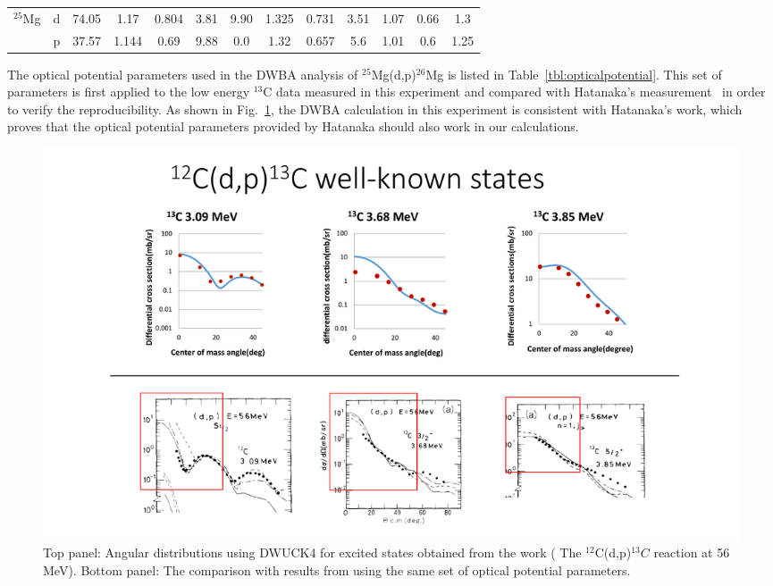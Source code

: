 {\begin{center}
\begin{longtable}{lcccccccccccc}
\endhead %

\endfoot %
  \bottomrule
\endlastfoot %
   $^{25}$Mg    &d & 74.05   &  1.17  &   0.804 &   3.81  &  9.90  & 1.325 &  0.731 &   3.51  &   1.07 &  0.66  & 1.3  \\
                &p & 37.57   &  1.144 &   0.69  &   9.88  &  0.0   & 1.32  &  0.657 &   5.6   &   1.01 &  0.6   & 1.25 \\
  \end{longtable}
\end{center}

The optical potential parameters used in the DWBA analysis of $^{25}$Mg(d,p)$^{26}$Mg is listed in Table~\ref{tbl:opticalpotential}. This set of parameters is first applied to the low energy $^{13}$C data measured in this experiment and compared with Hatanaka's measurement~\citep{HATANAKA1984530} in order to verify the reproducibility. As shown in Fig.~\ref{fig:13C}, the DWBA calculation in this experiment is consistent with Hatanaka's work, which proves that the optical potential parameters provided by Hatanaka should also work in our calculations.



\begin{landscape}
\begin{figure}[tpb]
  \begin{center}
    \centerline{\includegraphics[scale=0.6]{graph/ch5/13C}}
    \caption{Top panel: Angular distributions using DWUCK4 for excited states obtained from the work ( The $^{12}$C(d,p)$^{13}C$ reaction at 56 MeV). Bottom panel: The comparison with results from \citep{HATANAKA1984530} using the same set of optical potential parameters.  }
    \label{fig:13C}
  \end{center}
\end{figure}
\end{landscape}

}

